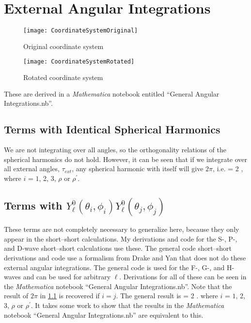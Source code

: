 \documentclass[Dissertation.tex]{subfiles}
\begin{document}
\section{External Angular Integrations}
\label{sec:AngularInt}

\begin{figure}[H]
	\centering
	\texttt{[image: CoordinateSystemOriginal]}
	\caption{Original coordinate system}
	\label{fig:CoordinateSystemOriginal}
\end{figure}

\begin{figure}[H]
	\centering
	\texttt{[image: CoordinateSystemRotated]}
	\caption{Rotated coordinate system}
	\label{fig:CoordinateSystemRotated}
\end{figure}

These are derived in a \emph{Mathematica} notebook entitled ``General Angular Integrations.nb''.

\subsection{Terms with Identical Spherical Harmonics}
\label{sec:AngSame}
We are not integrating over all angles, so the orthogonality relations of the spherical harmonics do not hold. However, it can be seen that if we integrate over all external angles, $\tau_{ext}$, any spherical harmonic with itself will give $2\pi$, i.e.
\beq
\label{eq:AngSame}
 = 2 \pi,
\eeq
where $i$ = $1$, 2, 3, $\rho$ or $\rho^\prime$.


\subsection{Terms with \texorpdfstring{$Y_\ell^0(\theta_i, \phi_i) Y_\ell^0(\theta_j, \phi_j)$}{Yi-Yj} }
\label{sec:AngRiRj}
These terms are not completely necessary to generalize here, because they only appear in the short--short calculations. My derivations and code for the S-, P-, and D-wave short--short calculations use these. The general code short--short derivations and code \cite{sec:} use a formalism from Drake and Yan \cite{Yan1997} that does not do these external angular integrations. The general code is used for the F-, G-, and H-waves and can be used for arbitrary $\ell$. Derivations for all of these can be seen in the \emph{Mathematica} notebook ``General Angular Integrations.nb''. Note that the result of $2\pi$ in \cref{sec:AngSame} is recovered if $i=j$. The general result is
\beq
\label{eq:AngRiRj}
 = 2 \pi {}.
\eeq
where $i$ = $1$, 2, 3, $\rho$ or $\rho^\prime$. It takes some work to show that the results in the \emph{Mathematica} notebook ``General Angular Integrations.nb'' are equivalent to this.
\end{document}
